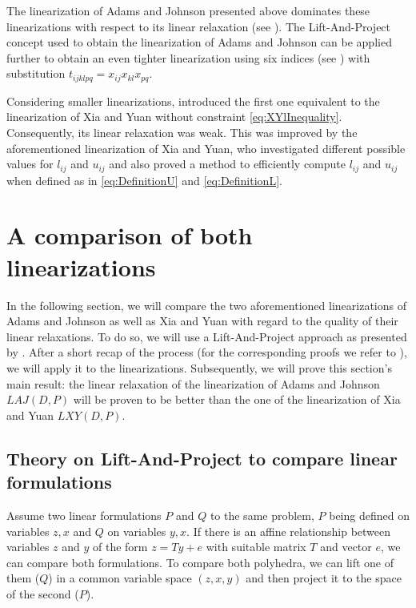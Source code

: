 The linearization of Adams and Johnson presented above dominates these linearizations with respect to its linear relaxation (see \cite{MR1290346}). The Lift-And-Project concept used to obtain the linearization of Adams and Johnson can be applied further to obtain an even tighter linearization using six indices (see \cite{MR2314426}) with substitution $t_{ijklpq} = x_{ij}x_{kl}x_{pq}$.

Considering smaller linearizations, \cite{KAUFMAN1978207} introduced the first one equivalent to the linearization of Xia and Yuan without constraint \eqref{eq:XYlInequality}. Consequently, its linear relaxation was weak. This was improved by the aforementioned linearization of Xia and Yuan, who investigated different possible values for $l_{ij}$ and $u_{ij}$ and also proved a method to efficiently compute $l_{ij}$ and $u_{ij}$ when defined as in \eqref{eq:DefinitionU} and \eqref{eq:DefinitionL}.

\section{A comparison of both linearizations}
\label{sec:comparison}
In the following section, we will compare the two aforementioned linearizations of Adams and Johnson as well as Xia and Yuan with regard to the quality of their linear relaxations. To do so, we will use a Lift-And-Project approach as presented by \cite{MR2194735}. After a short recap of the process (for the corresponding proofs we refer to \cite{MR2194735}), we will apply it to the linearizations. Subsequently, we will prove this section's main result: the linear relaxation of the linearization of Adams and Johnson $LAJ(D,P)$ will be proven to be better than the one of the linearization of Xia and Yuan $LXY(D,P)$.

\subsection{Theory on Lift-And-Project to compare linear formulations}

Assume two linear formulations $P$ and $Q$ to the same problem, $P$ being defined on variables $z, x$ and $Q$ on variables $y, x$. If there is an affine relationship between variables $z$ and $y$ of the form $z = Ty + e$ with suitable matrix $T$ and vector $e$, we can compare both formulations. To compare both polyhedra, we can lift one of them (\eg $Q$) in a common variable space $(z, x, y)$ and then project it to the space of the second ($P$). 


